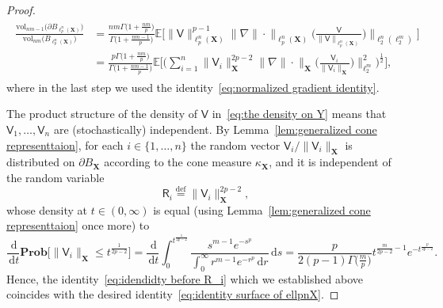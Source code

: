 \documentclass[11pt,reqno]{amsart}
\renewcommand{\le}{\leqslant}
\newcommand{\ud}[0]{\,\mathrm{d}}
\newcommand{\n}{\{1,\ldots,n\}}
\newcommand{\X}{\mathbf X}
\theoremstyle{remark}
\newcommand{\E}{\mathbb{ E}}
\newcommand{\eqdef}{\stackrel{\mathrm{def}}{=}}
\renewcommand{\Pr}{\mathbf{Prob}}
\newcommand{\vol}{\mathrm{vol}}
\renewcommand{\1}{\mathbf 1}
\newcommand{\V}{\mathsf{V}}
\newcommand{\RR}{\mathsf{R}}
\begin{document}
\begin{proof}
\begin{align}
\begin{split}
\frac{\vol_{nm-1}\big(\partial B_{\ell_p^n(\X)}\big)}{\vol_{nm}\big(B_{\ell_p^n(\X)}\big)}&= \frac{nm\Gamma\big(1+\frac{nm}{p}\big)}{\Gamma\big(1+\frac{nm-1}{p}\big)}\E\bigg[\|\V\|_{\ell_p^n(\X)}^{p-1} \Big\|\nabla\|\cdot\|_{\ell_p^n(\X)}\Big(\frac{\V}{\|\V\|_{\ell_p^n(\X)}}\Big)\Big\|_{\ell_2^n(\ell_2^m)}\bigg]\\&= \frac{p\Gamma\big(1+\frac{nm}{p}\big)}{\Gamma\big(1+\frac{nm-1}{p}\big)}\E\bigg[\Big(\sum_{i=1}^n \|\V_i\|_{\X}^{2p-2}\Big\|\nabla\|\cdot\|_{\X}\Big(\frac{\V_i}{\|\V_i\|_{\X}}\Big)\Big\|_{\ell_2^{m}}^2\Big)^{\frac{1}{2}}\bigg],
\end{split}
\end{align}
where in the last step we used the identity~\eqref{eq:normalized gradient identity}.

The product structure of the density of $\V$ in~\eqref{eq:the density on Y} means that $\V_1,\ldots,\V_n$ are (stochastically) independent. By Lemma~\ref{lem:generalized cone representtaion}, for each $i\in \n$ the random vector $\V_i/\|\V_i\|_{\X}$ is distributed on $\partial B_{\X}$ according to the cone measure $\kappa_{\X}$, and  it  is independent of the random variable
\begin{equation}\label{eq:def Ri}
\RR_i\eqdef \|\V_i\|_{\X}^{2p-2},
\end{equation}
whose density at $t\in (0,\infty)$ is equal (using Lemma~\ref{lem:generalized cone representtaion} once more) to
$$
\frac{\ud}{\ud t} \Pr\Big[ \|\V_i\|_{\X}\le t^{\frac{1}{2p-2}}\Big]=\frac{\ud}{\ud t} \int_0^{t^{\frac{1}{2p-2}}} \frac{s^{m-1}e^{-s^p}}{\int_0^\infty r^{m-1}e^{-r^p}\ud r}\ud s=\frac{p}{2(p-1)\Gamma\big(\frac{m}{p}\big)} t^{\frac{m}{2p-2}-1}e^{-t^{\frac{p}{2p-2}}}.
$$
Hence, the identity~\eqref{eq:idendidty before R_i} which we established above coincides with the desired identity~\eqref{eq:identity surface of ellpnX}.


\end{proof}
\end{document}
